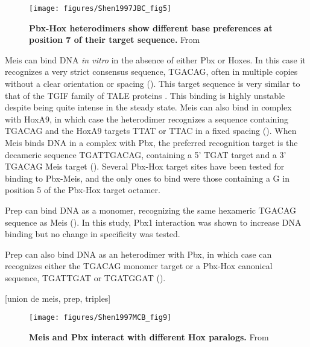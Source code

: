 \begin{figure}[]
  
  \centering
  \texttt{[image: figures/Shen1997JBC\_fig5]}
  \caption[Pbx-Hox heterodimers show different base preferences at position 7 of their target sequence]{\textbf{Pbx-Hox heterodimers show different base preferences at position 7 of their target sequence.} From \cite{Shen1997a}}
  \label{fig:Shen1997JBC_fig5}
\end{figure}

Meis can bind DNA \textit{in vitro} in the absence of either Pbx or Hoxes. In this case it recognizes a very strict consensus sequence, TGACAG, often in multiple copies without a clear orientation or spacing (\cite{Shen1997}). This target sequence is very similar to that of the TGIF family of TALE proteins \cite{ref}. This binding is highly unstable despite being quite  intense in the steady state. Meis can also bind in complex with HoxA9, in which case the heterodimer recognizes a sequence containing TGACAG and the HoxA9 targets TTAT or TTAC in a fixed spacing (\cite{Shen1997}). When Meis binds DNA in a complex with Pbx, the preferred recognition target is the decameric sequence TGATTGACAG, containing a 5' TGAT target and a 3' TGACAG Meis target (\cite{Chang1997}). Several Pbx-Hox target sites have been tested for binding to Pbx-Meis, and the only ones to bind were those containing a G in position 5 of the Pbx-Hox target octamer. 

Prep can bind DNA as a monomer, recognizing the same hexameric TGACAG sequence as Meis (\cite{Berthelsen1998a}). In this study, Pbx1 interaction was shown to increase DNA binding but no change in specificity was tested.

Prep can also bind DNA as an heterodimer with Pbx, in which case can recognizes either the TGACAG monomer target or a Pbx-Hox canonical sequence, TGATTGAT or TGATGGAT (\cite{Berthelsen1998}). 


[union de meis, prep, triples]

\begin{figure}[]
  
  \centering
  \texttt{[image: figures/Shen1997MCB\_fig9]}
  \caption[Meis and Pbx interact with different Hox paralogs]{\textbf{Meis and Pbx interact with different Hox paralogs.} From \cite{Shen1997}}
  \label{fig:Shen1997MCB_fig9}
\end{figure}

